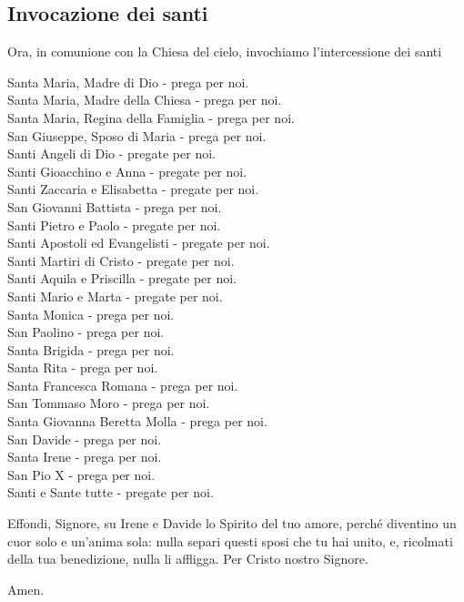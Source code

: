 \subsection*{Invocazione dei santi}

	\begin{dialoghi}
	\item[\sacerdotetutti] Ora, in comunione con la Chiesa del cielo, invochiamo l'intercessione dei santi

		Santa Maria, Madre di Dio - {prega per noi.}\\
		Santa Maria, Madre della Chiesa - {prega per noi.}\\
		Santa Maria, Regina della Famiglia - {prega per noi.}\\
		San Giuseppe, Sposo di Maria - {prega per noi.}\\
		Santi Angeli di Dio - {pregate per noi.}\\
		Santi Gioacchino e Anna - {pregate per noi.}\\
		Santi Zaccaria e Elisabetta - {pregate per noi.}\\
		San Giovanni Battista - {prega per noi.}\\
		Santi Pietro e Paolo - {pregate per noi.}\\
		Santi Apostoli ed Evangelisti - {pregate per noi.}\\
		Santi Martiri di Cristo - {pregate per noi.}\\
		Santi Aquila e Priscilla - {pregate per noi.}\\
		Santi Mario e Marta - {pregate per noi.}\\
		Santa Monica - {prega per noi.}\\
		San Paolino - {prega per noi.}\\
		Santa Brigida - {prega per noi.}\\
		Santa Rita - {prega per noi.}\\
		Santa Francesca Romana - {prega per noi.}\\
		San Tommaso Moro - {prega per noi.}\\
		Santa Giovanna Beretta Molla - {prega per noi.}\\
		San Davide - {prega per noi.}\\
		Santa Irene - {prega per noi.}\\
		San Pio X - {prega per noi.}\\
		Santi e Sante tutte - {pregate per noi.}
		\item[\sacerdote] Effondi, Signore, su Irene e Davide lo Spirito del tuo amore, perché diventino un cuor solo e un'anima sola: nulla separi questi sposi che tu hai unito, e, ricolmati della tua benedizione, nulla li affligga. Per Cristo nostro Signore.
		\item[\assemblea] Amen.
	\end{dialoghi}

